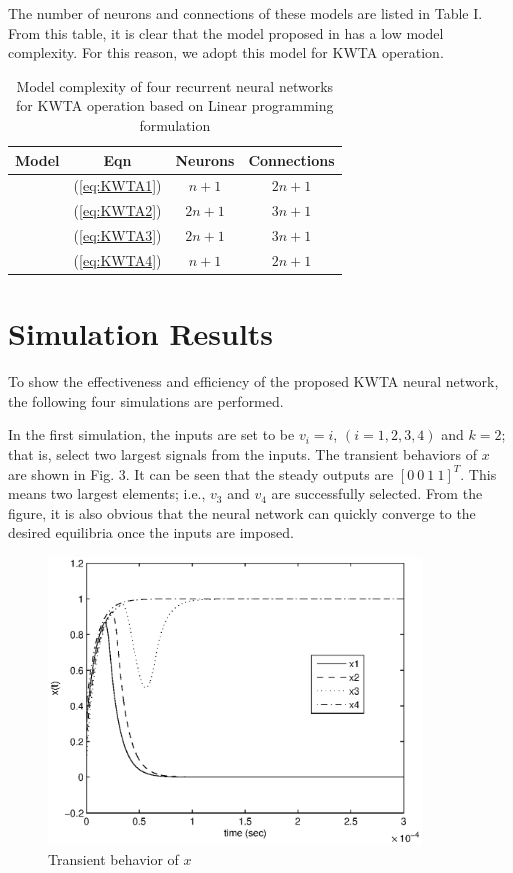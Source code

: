 \documentclass[conference]{IEEEtran}
\begin{document}
The number of neurons and connections of these models are listed in
Table I. From this table, it is clear that the model proposed in
\cite{cit:27} has a low model complexity. For this reason, we adopt
this model for KWTA operation.

\begin{table}[h]
\caption{Model complexity of four recurrent neural networks for KWTA
operation based on Linear programming formulation}
\begin{center}
\begin{tabular}{|c|c|c|c|}
\hline
\multicolumn{1}{|c|}{Model}%
& \multicolumn{1}{|c|}{Eqn}%
& \multicolumn{1}{|c|}{Neurons}%
& \multicolumn{1}{|c|}{Connections} \\%
 \hline
 \cite{cit:24} & (\ref{eq:KWTA1}) &  $n+1$  &  $2n+1$\\ \hline
 \cite{cit:25} & (\ref{eq:KWTA2}) &  $2n+1$  &  $3n+1$\\ \hline
 \cite{cit:26} & (\ref{eq:KWTA3}) &  $2n+1$  &  $3n+1$\\ \hline
 \cite{cit:27} & (\ref{eq:KWTA4}) &  $n+1$  &  $2n+1$  \\ \hline
\end{tabular}
\label{tab-liu2}
\end{center}
\end{table}

\section{Simulation Results}

To show the effectiveness and efficiency of the proposed KWTA neural
network, the following four simulations are performed.

In the first simulation, the inputs are set to be $v_i=i$,
$(i=1,2,3,4)$ and $k=2$; that is, select two largest signals from
the inputs. The transient behaviors of $x$ are shown in Fig. 3. It
can be seen that the steady outputs are $[0\ 0\ 1\ 1]^{T}$. This
means two largest elements; i.e., $v_3$ and $v_4$ are successfully
selected. From the figure, it is also obvious that the neural
network can quickly converge to the desired equilibria once the
inputs are imposed.

\begin{figure}[htp]
\centerline{\includegraphics[width=3.9in]{dynamic.eps}}
\caption{Transient behavior of $x$} \label{fig_3}
\end{figure}
\end{document}
